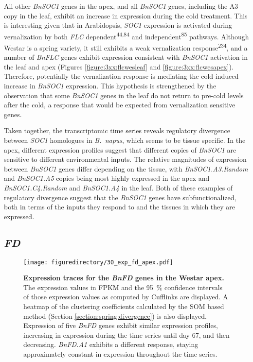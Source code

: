 \documentclass[12pt,]{book}
\begin{document}
All other \emph{BnSOC1} genes in the apex, and all \emph{BnSOC1} genes,
including the A3 copy in the leaf, exhibit an increase in expression
during the cold treatment. This is interesting given that in
Arabidopsis, \emph{SOC1} expression is activated during vernalization by
both \emph{FLC} dependent\textsuperscript{44,84} and
independent\textsuperscript{85} pathways. Although Westar is a spring
variety, it still exhibits a weak vernalization
response\textsuperscript{234}, and a number of \emph{BnFLC} genes
exhibit expression consistent with \emph{BnSOC1} activation in the leaf
and apex (Figures \ref{figure:3xx:flcwesleaf} and
\ref{figure:3xx:flcwesapex}). Therefore, potentially the vernalization
response is mediating the cold-induced increase in \emph{BnSOC1}
expression. This hypothesis is strengthened by the observation that some
\emph{BnSOC1} genes in the leaf do not return to pre-cold levels after
the cold, a response that would be expected from vernalization sensitive
genes.

Taken together, the transcriptomic time series reveals regulatory
divergence between \emph{SOC1} homologues in \emph{B.~napus}, which
seems to be tissue specific. In the apex, different expression profiles
suggest that different copies of \emph{BnSOC1} are sensitive to
different environmental inputs. The relative magnitudes of expression
between \emph{BnSOC1} genes differ depending on the tissue, with
\emph{BnSOC1.A3.Random} and \emph{BnSOC1.A5} copies being most highly
expressed in the apex and \emph{BnSOC1.C4.Random} and \emph{BnSOC1.A4}
in the leaf. Both of these examples of regulatory divergence suggest
that the \emph{BnSOC1} genes have subfunctionalized, both in terms of
the inputs they respond to and the tissues in which they are expressed.

\subsection{\texorpdfstring{\emph{FD}}{FD}}\label{section:spring:fd}

\begin{figure}[htbp]
\centering
\texttt{[image: figuredirectory/30\_exp\_fd\_apex.pdf]}
\caption{\textbf{Expression traces for the \emph{BnFD} genes in the
Westar apex.} The expression values in FPKM and the 95~\% confidence
intervals of those expression values as computed by Cufflinks are
displayed. A heatmap of the clustering coefficients calculated by the
SOM based method (Section \ref{section:spring:divergence}) is also
displayed. Expression of five \emph{BnFD} genes exhibit similar
expression profiles, increasing in expression during the time series
until day 67, and then decreasing. \emph{BnFD.A1} exhibits a different
response, staying approximately constant in expression throughout the
time series.}\label{figure:230:fdapex}
\end{figure}
\end{document}
